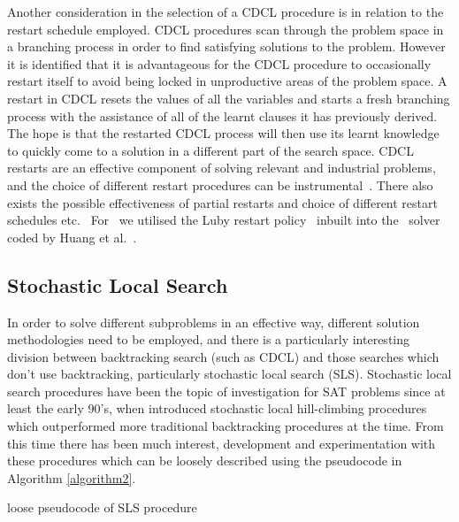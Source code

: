 \documentclass[
10pt, %
a4paper, %
oneside, %
headinclude,footinclude, %
BCOR5mm, %
]{scrartcl}
\begin{document}
Another consideration in the selection of a CDCL procedure is in relation to the restart schedule employed.
CDCL procedures scan through the problem space in a branching process in order to find satisfying solutions to the problem. However it is identified that it is advantageous for the CDCL procedure to occasionally restart itself to avoid being locked in unproductive areas of the problem space.
A restart in CDCL resets the values of all the variables and starts a fresh branching process with the assistance of all of the learnt clauses it has previously derived.
The hope is that the restarted CDCL process will then use its learnt knowledge to quickly come to a solution in a different part of the search space.
CDCL restarts are an effective component of solving relevant and industrial problems, and the choice of different restart procedures can be instrumental~\cite{DBLP:conf/ijcai/Huang07}.
There also exists the possible effectiveness of partial restarts and choice of different restart schedules etc.~\cite{conf/sat/RamosTH11}
For \dagster\  we utilised the Luby restart policy~\cite{Luby93optimalspeedup} inbuilt into the \tinisat\ solver coded by Huang et al.~\cite{DBLP:conf/ijcai/Huang07}.





\subsection{Stochastic Local Search}\label{sec:SLS_intro}

In order to solve different subproblems in an effective way, different solution methodologies need to be employed, and there is a particularly interesting division between backtracking search (such as CDCL) and those searches which don't use backtracking, particularly stochastic local search (SLS).
Stochastic local search procedures have been the topic of investigation for SAT problems since at least the early 90's, when \cite{10.5555/1867135.1867203,10.1145/130836.130837} introduced stochastic local hill-climbing procedures which outperformed more traditional backtracking procedures at the time.
From this time there has been much interest, development and experimentation with these procedures which can be loosely described using the pseudocode in Algorithm \ref{algorithm2}.

\begin{algorithm}[H]
\SetAlgoLined
{}
 \caption{loose pseudocode of SLS procedure}\label{algorithm2}
\end{algorithm}
\end{document}
